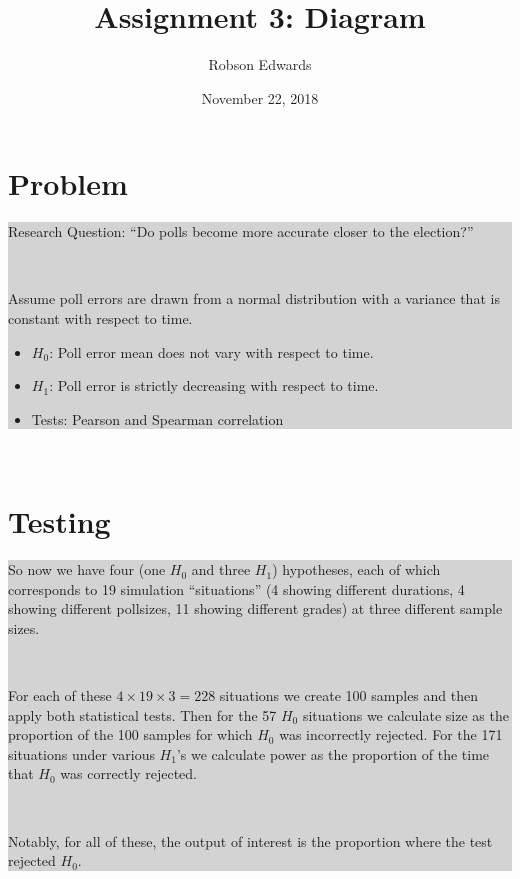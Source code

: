 \documentclass[10pt, oneside]{article}
\title{Assignment 3: Diagram}
\author{Robson Edwards}
\date{November 22, 2018}		%
\newcommand \diabox[2]{\colorbox{lightgray}{\parbox{#1}{#2}}}
\begin{document}
\maketitle

\begin{minipage}[t]{8cm}

\begin{minipage}[t]{8cm}

\section*{Problem}
\diabox{8cm}{
Research Question: ``Do polls become more accurate closer to the election?''

~

Assume poll errors are drawn from a normal distribution with a variance that is constant with respect to time.

\begin{itemize}
\item $H_0$: Poll error mean does not vary with respect to time.

\item $H_1$: Poll error is strictly decreasing with respect to time. 

\item Tests: Pearson and Spearman correlation
\end{itemize}

}
\end{minipage}

\begin{minipage}[t]{8cm}
~

\section*{Testing}
\diabox{8cm}{
So now we have four (one $H_0$ and three $H_1$) hypotheses, each of which corresponds to 19 simulation ``situations'' (4 showing different durations, 4 showing different pollsizes, 11 showing different grades) at three different sample sizes. 

~

For each of these $4 \times 19 \times 3 = 228$ situations we create 100 samples and then apply both statistical tests.
Then for the 57 $H_0$ situations we calculate size as the proportion of the 100 samples for which $H_0$ was incorrectly rejected.
For the 171 situations under various $H_1$'s we calculate power as the proportion of the time that $H_0$ was correctly rejected. 

~

Notably, for all of these, the output of interest is the proportion where the test rejected $H_0$. 
}

\end{minipage}

\end{minipage}
\end{document}
